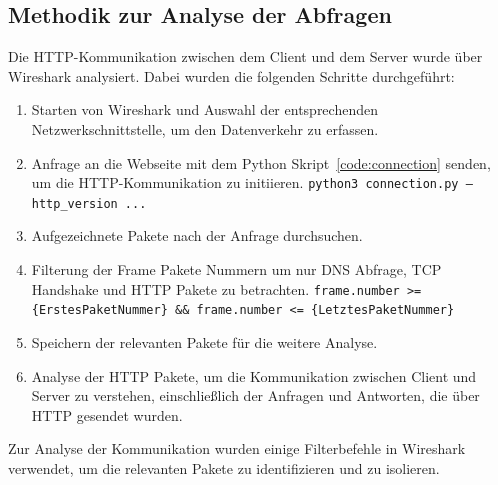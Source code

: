 \FloatBarrier
\subsection{Methodik zur Analyse der Abfragen}

Die HTTP-Kommunikation zwischen dem Client und dem Server wurde über Wireshark analysiert.
Dabei wurden die folgenden Schritte durchgeführt:

\begin{enumerate}\label{enum:wireshark_capture_method}
    \item Starten von Wireshark und Auswahl der entsprechenden Netzwerkschnittstelle, um den Datenverkehr zu erfassen.
    \item Anfrage an die Webseite mit dem Python Skript~\ref{code:connection} senden, um die HTTP-Kommunikation zu initiieren.
    \subitem \texttt{python3 connection.py --http\_version ...}
    \item Aufgezeichnete Pakete nach der Anfrage durchsuchen.
    \item Filterung der Frame Pakete Nummern um nur DNS Abfrage, TCP Handshake und HTTP Pakete zu betrachten.
    \subitem \texttt{frame.number >= \{ErstesPaketNummer\} \&\& frame.number <= \{LetztesPaketNummer\}}
    \item Speichern der relevanten Pakete für die weitere Analyse.
    \item Analyse der HTTP Pakete, um die Kommunikation zwischen Client und Server zu verstehen, einschließlich der Anfragen und Antworten, die über HTTP gesendet wurden.
\end{enumerate}

Zur Analyse der Kommunikation wurden einige Filterbefehle in Wireshark verwendet, um die relevanten Pakete zu identifizieren und zu isolieren.

